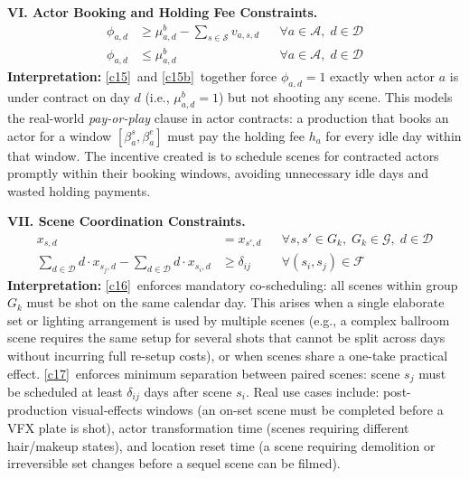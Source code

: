 \medskip
\noindent\textbf{VI. Actor Booking and Holding Fee Constraints.}
\vspace{-4pt}
\begin{align}
\phi_{a,d} &\geq \mu^b_{a,d} - \sum_{s \in \mathcal{S}} v_{a,s,d} && \forall a \in \mathcal{A},\; d \in \mathcal{D} \tag{C15}\label{c15}\\
\phi_{a,d} &\leq \mu^b_{a,d} && \forall a \in \mathcal{A},\; d \in \mathcal{D} \tag{C15b}\label{c15b}
\end{align}
\textbf{Interpretation:}
\ref{c15}~and \ref{c15b}~together force $\phi_{a,d} = 1$ exactly when actor $a$ is under contract on day $d$ (i.e., $\mu^b_{a,d} = 1$) but not shooting any scene.
This models the real-world \emph{pay-or-play} clause in actor contracts: a production that books an actor for a window $[\beta^s_a, \beta^e_a]$ must pay the holding fee $h_a$ for every idle day within that window.
The incentive created is to schedule scenes for contracted actors promptly within their booking windows, avoiding unnecessary idle days and wasted holding payments.

\medskip
\noindent\textbf{VII. Scene Coordination Constraints.}
\vspace{-4pt}
\begin{align}
x_{s,d} &= x_{s',d} && \forall s, s' \in G_k,\; G_k \in \mathcal{G},\; d \in \mathcal{D} \tag{C16}\label{c16}\\
\sum_{d \in \mathcal{D}} d \cdot x_{s_j,d} - \sum_{d \in \mathcal{D}} d \cdot x_{s_i,d} &\geq \delta_{ij} && \forall (s_i, s_j) \in \mathcal{F} \tag{C17}\label{c17}
\end{align}
\textbf{Interpretation:}
\ref{c16}~enforces mandatory co-scheduling: all scenes within group $G_k$ must be shot on the same calendar day.
This arises when a single elaborate set or lighting arrangement is used by multiple scenes (e.g., a complex ballroom scene requires the same setup for several shots that cannot be split across days without incurring full re-setup costs), or when scenes share a one-take practical effect.
\ref{c17}~enforces minimum separation between paired scenes: scene $s_j$ must be scheduled at least $\delta_{ij}$ days after scene $s_i$.
Real use cases include: post-production visual-effects windows (an on-set scene must be completed before a VFX plate is shot), actor transformation time (scenes requiring different hair/makeup states), and location reset time (a scene requiring demolition or irreversible set changes before a sequel scene can be filmed).

